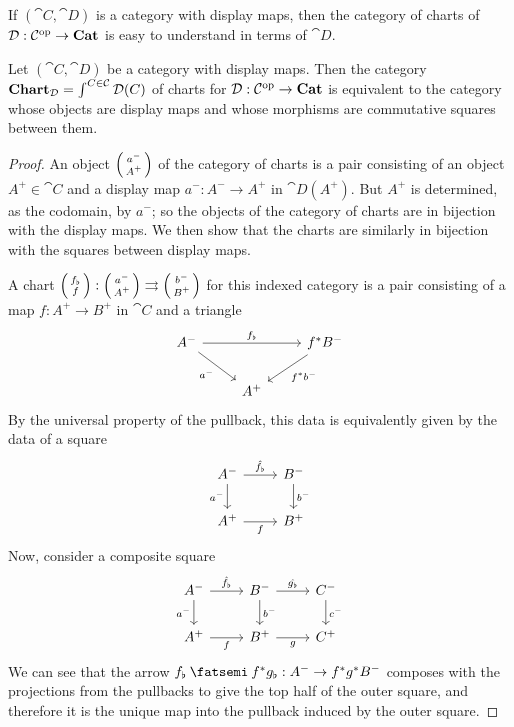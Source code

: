 \documentclass[DynamicalBook]{subfiles}
\begin{document}
If $(\cat{C}, \cat{D})$ is a category with display maps, then the category of
charts of $\mathcal{D} : \mathcal{C}^{\textnormal{op}} \to \textbf{Cat}$ is easy to understand in terms of $\cat{D}$.
\begin{proposition}\label{prop.display_maps_charts}
Let $(\cat{C}, \cat{D})$ be a category with display maps. Then the category
$\textbf{Chart}_{\mathcal{D}} = \int^{C \in \mathcal{C}}\mathcal{D}(C)$ 
of charts for $\mathcal{D} : \mathcal{C}^{\textnormal{op}} \to \textbf{Cat}$ is equivalent to the category
whose objects are display maps and whose morphisms are commutative squares
between them. 
\end{proposition}
\begin{proof}
An object $\lens{a^-}{A^+}$ of the category of charts is a pair consisting of an
object $A^+ \in \cat{C}$ and a display map $a^- : A^- \to A^+$ in
$\cat{D}(A^+)$. But $A^+$ is determined, as the codomain, by $a^-$; so the
objects of the category of charts are in bijection with the display maps. We
then show that the charts are similarly in bijection with
the squares between display maps.

A chart $\lens{f_{\flat}}{f} : \lens{a^-}{A^+} \rightrightarrows
\lens{b^-}{B^+}$ for this indexed category is a pair consisting of a map $f :
A^+ \to B^+$ in $\cat{C}$ and a triangle
\[
\begin{tikzcd}
A^- \arrow[rd, "a^-"'] \arrow[rr, "f_{\flat}"] &     & f^{\ast}B^- \arrow[ld, "f^{\ast}b^-"] \\
                                               & A^+ &                                      
\end{tikzcd}
\]
By the universal property of the pullback, this data is equivalently given by
the data of a square
\[
\begin{tikzcd}
A^- \arrow[d, "a^-"'] \arrow[r, "\hat{f_{\flat}}"] & B^- \arrow[d, "b^-"] \\
A^+ \arrow[r, "f"']                                & B^+                 
\end{tikzcd}
\]
Now, consider a composite square
\[
\begin{tikzcd}
A^- \arrow[d, "a^-"'] \arrow[r, "\hat{f_{\flat}}"] & B^- \arrow[d, "b^-"] \arrow[r, "\hat{g_{\flat}}"] & C^- \arrow[d, "c^-"] \\
A^+ \arrow[r, "f"']                                & B^+ \arrow[r, "g"']                               & C^+                 
\end{tikzcd}
\]
We can see that the arrow $f_{\flat} \then f^{\ast}g_{\flat} : A^- \to
f^{\ast}g^{\ast}B^-$ composes with the projections from the pullbacks to give
the top half of the outer square, and therefore it is the unique map into the
pullback induced by the outer square.
\end{proof}
\end{document}

